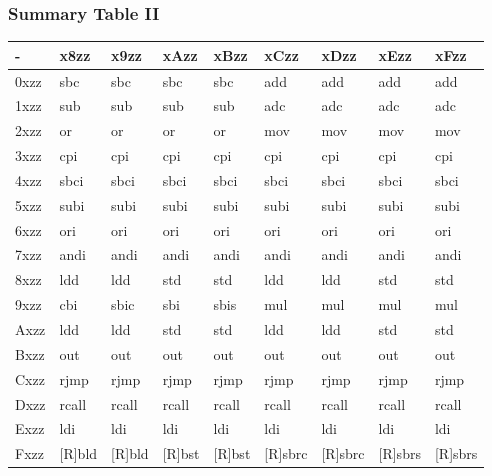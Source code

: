 \documentclass{beamer}
\begin{document}
\begin{frame}
\frametitle{Summary Table II}
\small
\begin{center}
    \begin{tabular}{| l | l | l | l | l | l | l | l | l |}
    \hline
    - & x8zz & x9zz & xAzz & xBzz & xCzz & xDzz & xEzz & xFzz \\    \hline
    0xzz & sbc & sbc & sbc & sbc & add & add & add & add \\ \hline
    1xzz & sub & sub & sub & sub & adc & adc & adc & adc \\ \hline
    2xzz & or & or & or & or & mov & mov & mov & mov \\ \hline
    3xzz & cpi & cpi & cpi & cpi & cpi & cpi & cpi & cpi \\ \hline
    4xzz & sbci & sbci & sbci & sbci & sbci & sbci & sbci & sbci \\ \hline
    5xzz & subi & subi & subi & subi & subi & subi & subi & subi \\ \hline
    6xzz & ori & ori & ori & ori & ori & ori & ori & ori \\ \hline
    7xzz & andi & andi & andi & andi & andi & andi & andi & andi \\ \hline
    8xzz & ldd & ldd & std & std & ldd & ldd & std & std \\ \hline
    9xzz & cbi & sbic & sbi & sbis & mul & mul &  mul & mul \\ \hline
    Axzz  & ldd & ldd & std & std & ldd & ldd & std & std \\ \hline
    Bxzz & out & out & out & out & out & out & out & out \\ \hline
        Cxzz & rjmp & rjmp & rjmp & rjmp & rjmp & rjmp & rjmp & rjmp \\ \hline
    Dxzz & rcall & rcall & rcall & rcall & rcall & rcall & rcall & rcall \\ \hline
    Exzz & ldi & ldi & ldi & ldi & ldi & ldi & ldi & ldi \\ \hline
    Fxzz &[R]bld & [R]bld & [R]bst & [R]bst & [R]sbrc & [R]sbrc & [R]sbrs & [R]sbrs \\ \hline
    \end{tabular}
\end{center}
\end{frame}

\end{document}
